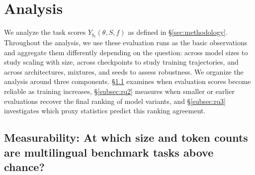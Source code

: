 \section{Analysis}
\label{sec:results}

We analyze the task scores $Y_{b_\ell}(\theta,S,f)$ as defined in \S\ref{sec:methodology}.
Throughout the analysis, we use these evaluation runs as the basic observations and aggregate them differently depending on the question: across model sizes to study scaling with size, across checkpoints to study training trajectories, and across architectures, mixtures, and seeds to assess robustness.
We organize the analysis around three components. \S\ref{subsec:rq0} examines when evaluation scores become reliable as training increases, \S\ref{subsec:rq2} measures when smaller or earlier evaluations recover the final ranking of model variants, and \S\ref{subsec:rq3} investigates which proxy statistics predict this ranking agreement.

\subsection{Measurability: At which size and token counts are multilingual benchmark tasks above chance?}
\label{subsec:rq0}

